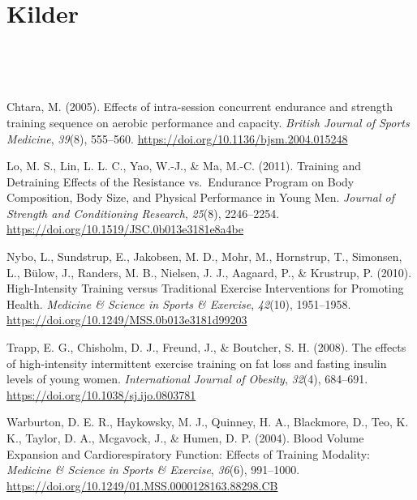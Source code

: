 \documentclass[
]{article}
\begin{document}
\hypertarget{kilder}{%
\section{Kilder}\label{kilder}}

~

~

Chtara, M. (2005). Effects of intra-session concurrent endurance and
strength training sequence on aerobic performance and capacity.
\emph{British Journal of Sports Medicine}, \emph{39}(8), 555--560.
\url{https://doi.org/10.1136/bjsm.2004.015248}

Lo, M. S., Lin, L. L. C., Yao, W.-J., \& Ma, M.-C. (2011). Training and
Detraining Effects of the Resistance vs.~Endurance Program on Body
Composition, Body Size, and Physical Performance in Young Men.
\emph{Journal of Strength and Conditioning Research}, \emph{25}(8),
2246--2254. \url{https://doi.org/10.1519/JSC.0b013e3181e8a4be}

Nybo, L., Sundstrup, E., Jakobsen, M. D., Mohr, M., Hornstrup, T.,
Simonsen, L., Bülow, J., Randers, M. B., Nielsen, J. J., Aagaard, P., \&
Krustrup, P. (2010). High-Intensity Training versus Traditional Exercise
Interventions for Promoting Health. \emph{Medicine \& Science in Sports
\& Exercise}, \emph{42}(10), 1951--1958.
\url{https://doi.org/10.1249/MSS.0b013e3181d99203}

Trapp, E. G., Chisholm, D. J., Freund, J., \& Boutcher, S. H. (2008).
The effects of high-intensity intermittent exercise training on fat loss
and fasting insulin levels of young women. \emph{International Journal
of Obesity}, \emph{32}(4), 684--691.
\url{https://doi.org/10.1038/sj.ijo.0803781}

Warburton, D. E. R., Haykowsky, M. J., Quinney, H. A., Blackmore, D.,
Teo, K. K., Taylor, D. A., Mcgavock, J., \& Humen, D. P. (2004). Blood
Volume Expansion and Cardiorespiratory Function: Effects of Training
Modality: \emph{Medicine \& Science in Sports \& Exercise},
\emph{36}(6), 991--1000.
\url{https://doi.org/10.1249/01.MSS.0000128163.88298.CB}
\end{document}
